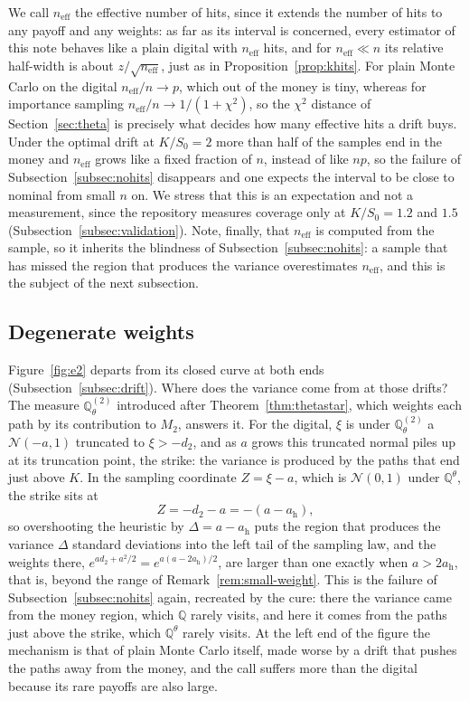 \documentclass[11pt,a4paper]{article}
\theoremstyle{plain}
\theoremstyle{definition}
\theoremstyle{remark}
\newcommand{\Q}{\mathbb{Q}}
\newcommand{\1}{\mathbf{1}}
\newcommand{\Qt}{\Q^{\theta}}
\begin{document}
We call $n_{\mathrm{eff}}$ the effective number of hits, since it extends the number of hits to any payoff and any weights: as far as its interval is concerned, every estimator of this note behaves like a plain digital with $n_{\mathrm{eff}}$ hits, and for $n_{\mathrm{eff}} \ll n$ its relative half-width is about $z/\sqrt{n_{\mathrm{eff}}}$, just as in Proposition~\ref{prop:khits}. For plain Monte Carlo on the digital $n_{\mathrm{eff}}/n \to p$, which out of the money is tiny, whereas for importance sampling $n_{\mathrm{eff}}/n \to 1/(1 + \chi^2)$, so the $\chi^2$ distance of Section~\ref{sec:theta} is precisely what decides how many effective hits a drift buys. Under the optimal drift at $K/S_0 = 2$ more than half of the samples end in the money and $n_{\mathrm{eff}}$ grows like a fixed fraction of $n$, instead of like $np$, so the failure of Subsection~\ref{subsec:nohits} disappears and one expects the interval to be close to nominal from small $n$ on. We stress that this is an expectation and not a measurement, since the repository measures coverage only at $K/S_0 = 1.2$ and $1.5$ (Subsection~\ref{subsec:validation}). Note, finally, that $n_{\mathrm{eff}}$ is computed from the sample, so it inherits the blindness of Subsection~\ref{subsec:nohits}: a sample that has missed the region that produces the variance overestimates $n_{\mathrm{eff}}$, and this is the subject of the next subsection.

\subsection{Degenerate weights}
\label{subsec:weights}

Figure~\ref{fig:e2} departs from its closed curve at both ends (Subsection~\ref{subsec:drift}). Where does the variance come from at those drifts? The measure $\Q^{(2)}_\theta$ introduced after Theorem~\ref{thm:thetastar}, which weights each path by its contribution to $M_2$, answers it. For the digital, $\xi$ is under $\Q^{(2)}_\theta$ a $\mathcal N(-a, 1)$ truncated to $\xi > -d_2$, and as $a$ grows this truncated normal piles up at its truncation point, the strike: the variance is produced by the paths that end just above $K$. In the sampling coordinate $Z = \xi - a$, which is $\mathcal N(0,1)$ under $\Qt$, the strike sits at
\[
  Z = -d_2 - a = -(a - a_{\mathrm h}),
\]
so overshooting the heuristic by $\Delta = a - a_{\mathrm h}$ puts the region that produces the variance $\Delta$ standard deviations into the left tail of the sampling law, and the weights there, $e^{ad_2 + a^2/2} = e^{a(a - 2a_{\mathrm h})/2}$, are larger than one exactly when $a > 2a_{\mathrm h}$, that is, beyond the range of Remark~\ref{rem:small-weight}. This is the failure of Subsection~\ref{subsec:nohits} again, recreated by the cure: there the variance came from the money region, which $\Q$ rarely visits, and here it comes from the paths just above the strike, which $\Qt$ rarely visits. At the left end of the figure the mechanism is that of plain Monte Carlo itself, made worse by a drift that pushes the paths away from the money, and the call suffers more than the digital because its rare payoffs are also large.
\end{document}
